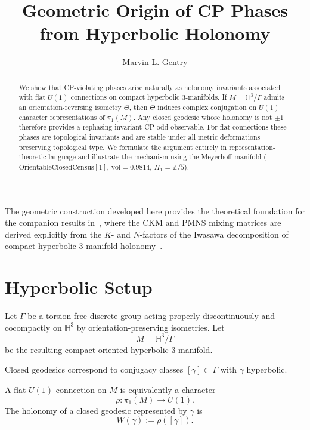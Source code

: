 \documentclass[epjc3]{svjour3}
\title{Geometric Origin of CP Phases from Hyperbolic Holonomy}
\author{Marvin L. Gentry}
\institute{Independent Researcher, Seattle, WA, USA \\
\email{drmlgentry@protonmail.com} \\
ORCID: 0009-0006-4550-2663}
\begin{document}
\maketitle

\begin{abstract}
We show that CP-violating phases arise naturally as holonomy invariants
associated with flat $U(1)$ connections on compact hyperbolic $3$-manifolds.
If $M = \mathbb{H}^3/\Gamma$ admits an orientation-reversing isometry $\Theta$,
then $\Theta$ induces complex conjugation on $U(1)$ character representations
of $\pi_1(M)$. Any closed geodesic whose holonomy is not $\pm 1$
therefore provides a rephasing-invariant CP-odd observable.
For flat connections these phases are topological invariants and
are stable under all metric deformations preserving topological type.
We formulate the argument entirely in representation-theoretic language
and illustrate the mechanism using the Meyerhoff manifold ($\mathrm{OrientableClosedCensus}[1]$, $\mathrm{vol}=0.9814$, $H_1=\mathbb{Z}/5$).
\end{abstract}

The geometric construction developed here provides the theoretical
foundation for the companion results in~\cite{Gentry:CKM,Gentry:PMNS},
where the CKM and PMNS mixing matrices are derived explicitly from the
$K$- and $N$-factors of the Iwasawa decomposition of compact hyperbolic
3-manifold holonomy~\cite{Gentry:CKM,Gentry:PMNS}.

\section{Hyperbolic Setup}

Let $\Gamma$ be a torsion-free discrete group acting properly discontinuously
and cocompactly on $\mathbb{H}^3$ by orientation-preserving isometries.
Let
\[
M = \mathbb{H}^3/\Gamma
\]
be the resulting compact oriented hyperbolic $3$-manifold.

Closed geodesics correspond to conjugacy classes
$[\gamma] \subset \Gamma$ with $\gamma$ hyperbolic.

\begin{definition}
A flat $U(1)$ connection on $M$ is equivalently a character
\[
\rho : \pi_1(M) \longrightarrow U(1).
\]
The holonomy of a closed geodesic represented by $\gamma$
is
\[
W(\gamma) := \rho([\gamma]).
\]
\end{definition}
\end{document}
